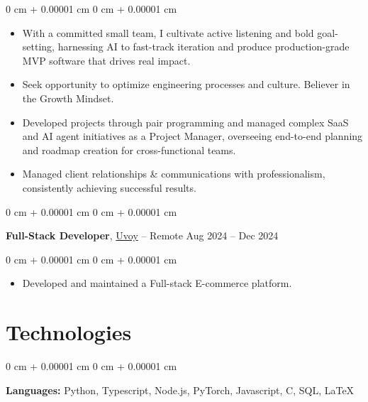 \documentclass[10pt, letterpaper]{article}
\newenvironment{highlights}{
    \begin{itemize}[
        topsep=0.10 cm,
        parsep=0.10 cm,
        partopsep=0pt,
        itemsep=0pt,
        leftmargin=0 cm + 10pt
    ]
}{
    \end{itemize}
} %
\newenvironment{onecolentry}{
    \begin{adjustwidth}{
        0 cm + 0.00001 cm
    }{
        0 cm + 0.00001 cm
    }
}{
    \end{adjustwidth}
} %
\newenvironment{twocolentry}[2][]{
    \onecolentry
    \def\secondColumn{#2}
    \setcolumnwidth{\fill, 4.5 cm}
    \begin{paracol}{2}
}{
    \switchcolumn \raggedleft \secondColumn
    \end{paracol}
    \endonecolentry
} %
\begin{document}
        \vspace{0.10 cm}
        \begin{onecolentry}
            \begin{highlights}
                \item  With a committed small team, I cultivate active listening and bold goal-setting, harnessing AI to fast-track iteration and produce production-grade MVP software that drives real impact.
                \item Seek opportunity to optimize engineering processes and culture. Believer in the Growth Mindset.
                \item Developed projects through pair programming and managed complex SaaS and AI agent initiatives as a Project Manager, overseeing end-to-end planning and roadmap creation for cross-functional teams.
                \item Managed client relationships \& communications with professionalism, consistently achieving successful results.

            \end{highlights}
        \end{onecolentry}


        \vspace{0.2 cm}

        \begin{twocolentry}{
            Aug 2024 – Dec 2024
        }
            \textbf{Full-Stack Developer}, \href{https://www.uvoystore.com/}{Uvoy} -- Remote\end{twocolentry}

        \vspace{0.10 cm}
        \begin{onecolentry}
            \begin{highlights}
                \item Developed and maintained a Full-stack E-commerce platform.
            \end{highlights}
        \end{onecolentry}


     \section{Technologies}
                \begin{onecolentry}
                    \textbf{Languages:} Python, Typescript, Node.js, PyTorch, Javascript, C, SQL, LaTeX
                \end{onecolentry}
            
\end{document}
